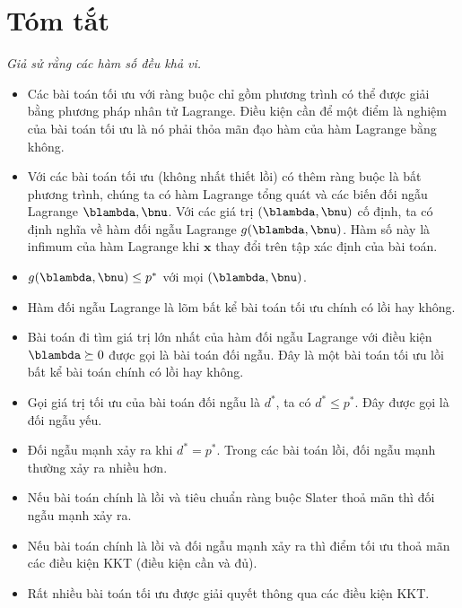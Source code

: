 \section{Tóm tắt}
\textit{Giả sử rằng các hàm số đều khả vi.}
\begin{itemize}
    \item Các bài toán tối ưu với ràng buộc chỉ gồm phương trình có thể được giải
     bằng phương pháp nhân tử Lagrange. Điều kiện cần để một điểm là nghiệm của bài toán tối ưu là nó
    phải thỏa mãn đạo hàm của hàm Lagrange bằng không.
     
    \item Với các bài toán tối ưu (không nhất thiết lồi) có thêm ràng buộc là bất phương trình, chúng ta có hàm Lagrange tổng quát và các biến đối ngẫu Lagrange
    $\blambda, \bnu$. Với các giá trị $(\blambda, \bnu)$ cố định, ta có định
    nghĩa về hàm đối ngẫu Lagrange 
    $g(\blambda, \bnu)$. Hàm số này là infimum của hàm Lagrange khi
    $\mathbf{x}$ thay đổi trên tập xác định của bài toán.
     

    \item $g(\blambda, \bnu) \leq p^*$ với mọi $(\blambda, \bnu)$.  

    \item Hàm đối ngẫu Lagrange là lõm bất kể bài toán tối ưu chính có lồi hay không. 
    
    \item Bài toán đi tìm giá trị lớn nhất của hàm đối ngẫu Lagrange với điều
    kiện $\blambda \succeq 0$ được gọi là {bài toán đối ngẫu}. Đây là một bài toán tối ưu lồi bất kể bài toán chính có lồi hay không. 
     
    \item Gọi giá trị tối ưu của bài toán đối ngẫu là $d^*$, ta có $d^*
    \leq p^*$. Đây được gọi là đối ngẫu yếu.
     
    \item Đối ngẫu mạnh xảy ra khi $d^* = p^*$. Trong các bài toán lồi, đối ngẫu mạnh thường xảy ra nhiều hơn.
     
    \item Nếu bài toán chính là lồi và tiêu chuẩn ràng buộc Slater thoả mãn thì đối ngẫu mạnh xảy ra.
     
    \item Nếu bài toán chính là lồi và đối ngẫu mạnh xảy ra thì điểm tối ưu thoả mãn các điều kiện KKT (điều kiện cần và đủ).
     
    \item Rất nhiều bài toán tối ưu được giải quyết thông qua các điều kiện KKT. 
 
\end{itemize}
 
